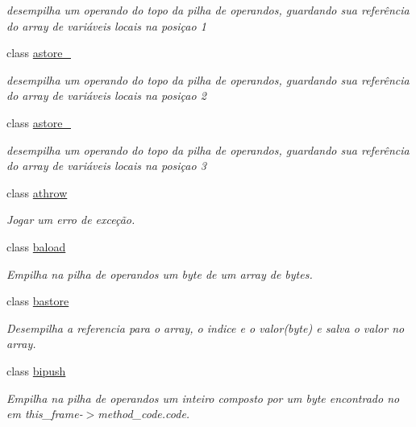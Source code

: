 \begin{DoxyCompactItemize}
\begin{DoxyCompactList}\small\item\em desempilha um operando do topo da pilha de operandos, guardando sua referência do array de variáveis locais na posiçao 1 \end{DoxyCompactList}\item 
class \hyperlink{class_instruction_impl_1_1astore__2}{astore\+\_}
\begin{DoxyCompactList}\small\item\em desempilha um operando do topo da pilha de operandos, guardando sua referência do array de variáveis locais na posiçao 2 \end{DoxyCompactList}\item 
class \hyperlink{class_instruction_impl_1_1astore__3}{astore\+\_}
\begin{DoxyCompactList}\small\item\em desempilha um operando do topo da pilha de operandos, guardando sua referência do array de variáveis locais na posiçao 3 \end{DoxyCompactList}\item 
class \hyperlink{class_instruction_impl_1_1athrow}{athrow}
\begin{DoxyCompactList}\small\item\em Jogar um erro de exceção. \end{DoxyCompactList}\item 
class \hyperlink{class_instruction_impl_1_1baload}{baload}
\begin{DoxyCompactList}\small\item\em Empilha na pilha de operandos um byte de um array de bytes. \end{DoxyCompactList}\item 
class \hyperlink{class_instruction_impl_1_1bastore}{bastore}
\begin{DoxyCompactList}\small\item\em Desempilha a referencia para o array, o indice e o valor(byte) e salva o valor no array. \end{DoxyCompactList}\item 
class \hyperlink{class_instruction_impl_1_1bipush}{bipush}
\begin{DoxyCompactList}\small\item\em Empilha na pilha de operandos um inteiro composto por um byte encontrado no em this\+\_\+frame-\/$>$method\+\_\+code.\+code. \end{DoxyCompactList}\item 

\end{DoxyCompactItemize}
